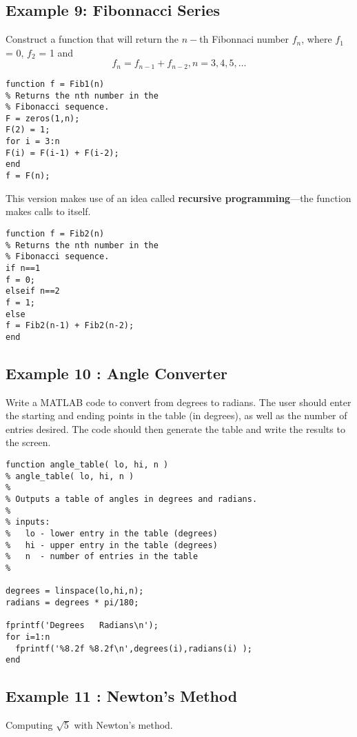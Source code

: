 \documentclass[a4paper,12pt]{article}
\begin{document}
\subsection{Example 9: Fibonnacci Series }
Construct a function that will
return the $n-$th Fibonnaci number $f_n$, where
$f_1$ = 0, $f_2$ = 1 and
\[f_n = f_{n-1} + f_{n-2}, n= 3, 4, 5,\ldots\]


\begin{framed}
\begin{verbatim}
function f = Fib1(n)
% Returns the nth number in the
% Fibonacci sequence.
F = zeros(1,n);
F(2) = 1;
for i = 3:n
F(i) = F(i-1) + F(i-2);
end
f = F(n);
\end{verbatim}
\end{framed}

This version makes use of an idea called \textbf{recursive
programming}—the function makes calls
to itself.
\begin{framed}
\begin{verbatim}
function f = Fib2(n)
% Returns the nth number in the
% Fibonacci sequence.
if n==1
f = 0;
elseif n==2
f = 1;
else
f = Fib2(n-1) + Fib2(n-2);
end
\end{verbatim}
\end{framed}
\subsection{Example 10 : Angle Converter}
Write a MATLAB code to convert from degrees to radians. The user
should enter the starting and ending points in the table (in degrees), as well as the number of entries desired. The code should then generate the table and write the results to the screen.
\begin{framed}
\begin{verbatim}
function angle_table( lo, hi, n )
% angle_table( lo, hi, n )
%
% Outputs a table of angles in degrees and radians.
%
% inputs:
%   lo - lower entry in the table (degrees)
%   hi - upper entry in the table (degrees)
%   n  - number of entries in the table
%

degrees = linspace(lo,hi,n);
radians = degrees * pi/180;

fprintf('Degrees   Radians\n');
for i=1:n
  fprintf('%8.2f %8.2f\n',degrees(i),radians(i) );
end
\end{verbatim}
\end{framed}


\subsection{Example 11 : Newton's Method}
Computing $\sqrt{5}$ with Newton's method.
\end{document}
